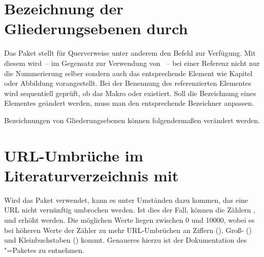 \section{Bezeichnung der Gliederungsebenen durch }
%
%
Das Paket  stellt für Querverweise unter anderem den Befehl 
 zur Verfügung. Mit diesem wird~-- im 
Gegensatz zur Verwendung von ~-- bei einer Referenz nicht nur die 
Nummerierung selber sondern auch das entsprechende Element wie Kapitel oder 
Abbildung vorangestellt. Bei der Benennung des referenzierten Elementes wird 
sequentiell geprüft, ob das Makro \Macro*{}
oder \Macro*{} existiert. Soll die Bezeichnung 
eines Elementes geändert werden, muss man den entsprechende Bezeichner anpassen.
%
\begin{Example}
Bezeichnungen von Gliederungsebenen können folgendermaßen verändert werden.
\begin{Code}
\end{Code}
\end{Example}



\section{URL-Umbrüche im Literaturverzeichnis mit }
%
%
Wird das Paket  verwendet, kann es unter Umständen dazu 
kommen, das eine URL nicht vernünftig umbrochen werden. Ist dies der Fall, 
können die Zählern ,  und 
 erhöht werden. Die möglichen Werte liegen zwischen 0 
und 10000, wobei es bei höheren Werte der Zähler zu mehr URL-Umbrüchen an 
Ziffern (), Groß- () und 
Kleinbuchstaben () kommt. Genaueres hierzu ist der 
Dokumentation des "=Paketes zu entnehmen.



